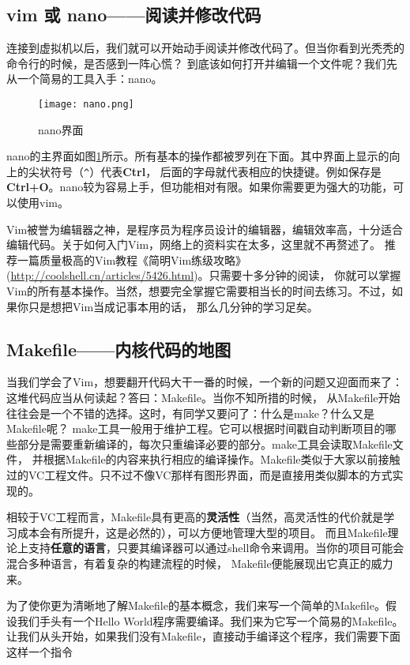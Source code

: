 \subsection{vim 或 nano——阅读并修改代码}
连接到虚拟机以后，我们就可以开始动手阅读并修改代码了。但当你看到光秃秃的命令行的时候，是否感到一阵心慌？
到底该如何打开并编辑一个文件呢？我们先从一个简易的工具入手：nano。

\begin{figure}[htbp]
  \centering
  \texttt{[image: nano.png]}
  \caption{nano界面}\label{fig:nano} 
\end{figure}

nano的主界面如图\ref{fig:nano}所示。所有基本的操作都被罗列在下面。其中界面上显示的向上的尖状符号（\verb|^|）代表\textbf{Ctrl}，
后面的字母就代表相应的快捷键。例如保存是\textbf{Ctrl+O}。nano较为容易上手，但功能相对有限。如果你需要更为强大的功能，可以使用vim。

Vim被誉为编辑器之神，是程序员为程序员设计的编辑器，编辑效率高，十分适合编辑代码。关于如何入门Vim，网络上的资料实在太多，这里就不再赘述了。
推荐一篇质量极高的Vim教程《简明Vim练级攻略》(\url{http://coolshell.cn/articles/5426.html})。只需要十多分钟的阅读，
你就可以掌握Vim的所有基本操作。当然，想要完全掌握它需要相当长的时间去练习。不过，如果你只是想把Vim当成记事本用的话，
那么几分钟的学习足矣。

\subsection{Makefile——内核代码的地图}
当我们学会了Vim，想要翻开代码大干一番的时候，一个新的问题又迎面而来了：这堆代码应当从何读起？答曰：Makefile。当你不知所措的时候，
从Makefile开始往往会是一个不错的选择。这时，有同学又要问了：什么是make？什么又是Makefile呢？
make工具一般用于维护工程。它可以根据时间戳自动判断项目的哪些部分是需要重新编译的，每次只重编译必要的部分。make工具会读取Makefile文件，
并根据Makefile的内容来执行相应的编译操作。Makefile类似于大家以前接触过的VC工程文件。只不过不像VC那样有图形界面，而是直接用类似脚本的方式实现的。

\begin{note}
相较于VC工程而言，Makefile具有更高的\textbf{灵活性}（当然，高灵活性的代价就是学习成本会有所提升，这是必然的），可以方便地管理大型的项目。
而且Makefile理论上支持\textbf{任意的语言}，只要其编译器可以通过shell命令来调用。当你的项目可能会混合多种语言，有着复杂的构建流程的时候，
Makefile便能展现出它真正的威力来。
\end{note}

为了使你更为清晰地了解Makefile的基本概念，我们来写一个简单的Makefile。假设我们手头有一个Hello World程序需要编译。我们来为它写一个简易的Makefile。
让我们从头开始，如果我们没有Makefile，直接动手编译这个程序，我们需要下面这样一个指令

